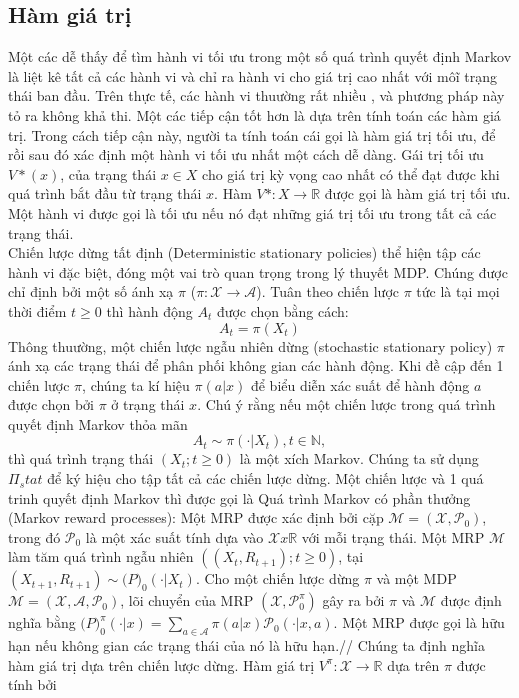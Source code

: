 \documentclass[14pt,a4paper,oneside]{report}		%
\begin{document}
\subsection{Hàm giá trị}
Một các dễ thấy để tìm hành vi tối ưu trong một số quá trình quyết định Markov là liệt kê tất cả các hành vi và chỉ ra hành vi cho giá trị cao nhất với môĩ trạng thái ban đầu. Trên thực tế, các hành vi thuường rất nhiều , và phương pháp này tỏ ra không khả thi. Một các tiếp cận tốt hơn là dựa trên tính toán các hàm giá trị. Trong cách tiếp cận này, người ta tính toán cái gọi là hàm giá trị tối ưu, để rồi sau đó xác định một hành vi tối ưu nhất một cách dễ dàng.
Gái trị tối ưu $V*(x)$, của trạng thái $x \in X$ cho giá trị kỳ vọng cao nhất có thể đạt được khi quá trình bắt đầu từ trạng thái $x$. Hàm $V* : X \rightarrow \mathbb{R}$ được gọi là hàm giá trị tối ưu. Một hành vi được gọi là tối ưu nếu nó đạt  những giá trị tối ưu trong tất cả các trạng thái.\\
Chiến lược dừng tất định (Deterministic stationary policies) thể hiện tập các hành vi đặc biệt, đóng một vai trò quan trọng trong lý thuyết MDP. Chúng được chỉ định bởi một số ánh xạ $\pi$ ($\pi : \mathcal{X}\rightarrow\mathcal{A}$). Tuân theo chiến lược $\pi$ tức là tại mọi thời điểm $t \geq 0$ thì hành động $A_t$ được chọn bằng cách:
\begin{equation} \label{eq6}
A_t = \pi (X_t)
\end{equation}
Thông thuường, một chiến lược ngẫu nhiên dừng (stochastic stationary policy) $\pi$ ánh xạ các trạng thái để phân phối không gian các hành động. Khi đề cập đến 1 chiến lược $\pi$, chúng ta kí hiệu $\pi (a|x)$ để biểu diễn xác suất để hành động $a$ được chọn bởi $\pi$ ở trạng thái $x$. Chú ý rằng nếu một chiến lược trong quá trình quyết định Markov thỏa mãn 
$$A_t  \sim \pi (\cdotp | X_t),  t \in \mathbb{N},$$ thì quá trình trạng thái $(X_t; t \geq 0)$ là một xích Markov. Chúng ta sử dụng $\Pi_stat$ để ký hiệu cho tập tất cả các chiến lược dừng.  Một chiến lược và 1 quá trinh quyết định Markov thì được gọi là Quá trình Markov có phần thưởng (Markov reward processes): Một MRP được xác định bởi cặp $\mathcal{M} = (\mathcal{X},\mathcal{P}_0)$, trong đó $\mathcal{P}_0$ là một xác suất tính dựa vào $\mathcal{X} x \mathbb{R}$ với mỗi trạng thái. Một MRP $\mathcal{M}$ làm tăm quá trình ngẫu nhiên $((X_t,R_{t+1});t\geq 0)$, tại $(X_{t+1},R_{t+1}) \sim \mathcal(P)_0(\cdotp | X_t)$. Cho một chiến lược dừng $\pi$ và một MDP $\mathcal{M} = (\mathcal{X},\mathcal{A},\mathcal{P}_0)$, lõi chuyển của MRP $(\mathcal{X},\mathcal{P}^\pi_0)$ gây ra bởi $\pi$ và $\mathcal{M}$ được định nghĩa bằng $\mathcal(P)^\pi_0(\cdotp|x) = \sum_{a \in \mathcal{A}} \pi(a|x)\mathcal{P}_0(\cdotp|x,a)$. Một MRP được gọi là hữu hạn nếu không gian các trạng thái của nó là hữu hạn.//
Chúng ta định nghĩa hàm giá trị dựa trên chiến lược dừng. Hàm giá trị $V^\pi:\mathcal{X}\rightarrow\mathbb{R}$ dựa trên $\pi$ được tính bởi 
\end{document}
